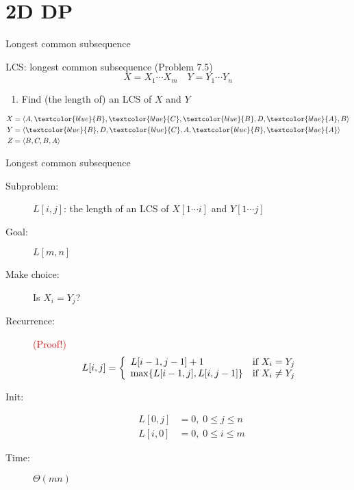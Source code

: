 \section{2D DP}

\begin{frame}{Longest common subsequence}
  \begin{exampleblock}{LCS: longest common subsequence (Problem 7.5)}
	\[
	  X = X_{1} \cdots X_{m} \quad Y = Y_{1} \cdots Y_{n}
	\]

	\begin{enumerate}[(1)]
      \item Find (the length of) an LCS of $X$ and $Y$
    \end{enumerate}
  \end{exampleblock}

  \begin{align*}
	X &= \langle A,\textcolor{blue}{B},\textcolor{blue}{C},\textcolor{blue}{B},D,\textcolor{blue}{A},B \rangle  \\
	Y &= \langle \textcolor{blue}{B},D,\textcolor{blue}{C},A,\textcolor{blue}{B},\textcolor{blue}{A} \rangle \\
	Z &= \langle B,C,B,A \rangle
  \end{align*}
\end{frame}
\begin{frame}{Longest common subsequence}
  \begin{description}
	\item[Subproblem:] $L[i,j]$: the length of an LCS of $X[1 \cdots i]$ and $Y[1 \cdots j]$
	\item[Goal:] $L[m,n]$
	  \pause
	\item[Make choice:] Is $X_{i} = Y_{j}$?
	\item[Recurrence:] \textcolor{red}{(Proof!)}
	  \begin{displaymath}
		L[i,j] = \left\{ \begin{array}{ll}
		  L[i-1, j-1] + 1 & \textrm{if $X_{i} = Y_{j}$}\\
		  \max \{L[i-1,j], L[i,j-1]\} & \textrm{if $X_{i} \neq Y_{j}$}
		\end{array} \right.
	  \end{displaymath}
	  \pause
	\item[Init:]
	  \begin{align*}
		L[0,j] &= 0, \; 0 \le j \le n \\
		L[i,0] &= 0, \; 0 \le i \le m 
	  \end{align*}
	\item[Time:] $\Theta(mn)$
  \end{description}
\end{frame}
